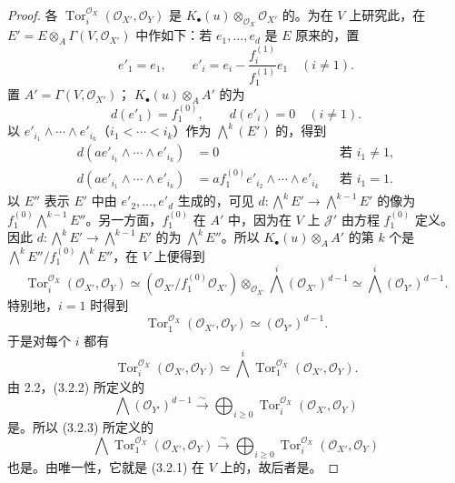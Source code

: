 \begin{proof}
各 $\operatorname{Tor}^{\mathcal O_X}_i(\mathcal O_{X'},\mathcal O_Y)$ 是 $K_\bullet(u)\otimes_{\mathcal O_X}\mathcal O_{X'}$ 的。为在 $V$ 上研究此，在 $E'=E\otimes_A\Gamma(V,\mathcal O_{X'})$ 中作如下：若 $e_1,\ldots,e_d$ 是 $E$ 原来的，置
\[
e'_1=e_1,\qquad e'_i=e_i-\frac{f_i^{(1)}}{f_1^{(1)}}e_1\quad(i\ne1).
\]
置 $A'=\Gamma(V,\mathcal O_{X'})$； $K_\bullet(u)\otimes_A A'$ 的为
\[
d(e'_1)=f_1^{(0)},\qquad d(e'_i)=0\quad(i\ne1).
\]
以 $e'_{i_1}\wedge\cdots\wedge e'_{i_k}$（$i_1<\cdots<i_k$）作为 $\bigwedge^k(E')$ 的，得到
\[
\begin{aligned}
d(ae'_{i_1}\wedge\cdots\wedge e'_{i_k})&=0&&\text{若 }i_1\ne1,\\
d(ae'_{i_1}\wedge\cdots\wedge e'_{i_k})&=af_1^{(0)}e'_{i_2}\wedge\cdots\wedge e'_{i_k}&&\text{若 }i_1=1.
\end{aligned}
\]
以 $E''$ 表示 $E'$ 中由 $e'_2,\ldots,e'_d$ 生成的，可见 $d:\bigwedge^k E'\to\bigwedge^{k-1}E'$ 的像为 $f_1^{(0)}\bigwedge^{k-1}E''$。另一方面，$f_1^{(0)}$ 在 $A'$ 中，因为在 $V$ 上 $\mathcal J'$ 由方程 $f_1^{(0)}$ 定义。因此 $d:\bigwedge^kE'\to\bigwedge^{k-1}E'$ 的为 $\bigwedge^kE''$。所以 $K_\bullet(u)\otimes_AA'$ 的第 $k$ 个是 $\bigwedge^kE''/f_1^{(0)}\bigwedge^kE''$，在 $V$ 上便得到
\[
\operatorname{Tor}^{\mathcal O_X}_i(\mathcal O_{X'},\mathcal O_Y)
\simeq(\mathcal O_{X'}/f_1^{(0)}\mathcal O_{X'})\otimes_{\mathcal O_{X'}}\bigwedge^i(\mathcal O_{X'})^{d-1}
\simeq\bigwedge^i(\mathcal O_{Y'})^{d-1}.\tag{3.2.2}
\]
特别地，$i=1$ 时得到
\[
\operatorname{Tor}^{\mathcal O_X}_1(\mathcal O_{X'},\mathcal O_Y)\simeq(\mathcal O_{Y'})^{d-1}.
\]
于是对每个 $i$ 都有
\[
\operatorname{Tor}^{\mathcal O_X}_i(\mathcal O_{X'},\mathcal O_Y)
\simeq\bigwedge^i\operatorname{Tor}^{\mathcal O_X}_1(\mathcal O_{X'},\mathcal O_Y).\tag{3.2.3}
\]
由 2.2，(3.2.2) 所定义的
\[
\bigwedge(\mathcal O_{Y'})^{d-1}\xrightarrow{\sim}\bigoplus_{i\geq0}\operatorname{Tor}^{\mathcal O_X}_i(\mathcal O_{X'},\mathcal O_Y)
\]
是。所以 (3.2.3) 所定义的
\[
\bigwedge\operatorname{Tor}^{\mathcal O_X}_1(\mathcal O_{X'},\mathcal O_Y)
\xrightarrow{\sim}\bigoplus_{i\geq0}\operatorname{Tor}^{\mathcal O_X}_i(\mathcal O_{X'},\mathcal O_Y)
\]
也是。由唯一性，它就是 (3.2.1) 在 $V$ 上的，故后者是。


\end{proof}
